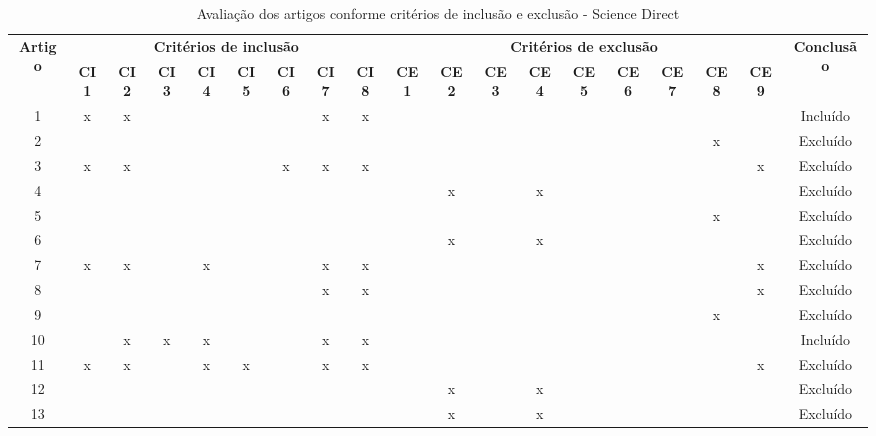 \documentclass[
	12pt,				%
	oneside,			%
	a4paper,			%
	english,			%
	brazil				%
	]{abntex2ppgsi}
\begin{document}
\begin{apendicesenv}
\begin{table}[H]
\centering
\caption{Avaliação dos artigos conforme critérios de inclusão e exclusão - Science Direct}
\label{tab:crit_IncExc_SD}
\setlength{\tabcolsep}{1.5pt} %
\footnotesize %
\begin{tabular}{c | c c c c c c c c | c c c c c c c c c | c}
\toprule
    \multirow{2}{*}{\textbf{Artigo}} & 
    \multicolumn{8}{c|}{\textbf{Critérios de inclusão}} &
    \multicolumn{9}{c|}{\textbf{Critérios de exclusão}} &
    \multirow{2}{*}{\textbf{Conclusão}} \\ 
    \cline{2-18}
 & \tiny\textbf{CI1} & \tiny\textbf{CI2} & \tiny\textbf{CI3} & \tiny\textbf{CI4} & \tiny\textbf{CI5} & \tiny\textbf{CI6} & \tiny\textbf{CI7} & \tiny\textbf{CI8} & \tiny\textbf{CE1} & \tiny\textbf{CE2} & \tiny\textbf{CE3} & \tiny\textbf{CE4} & \tiny\textbf{CE5} & \tiny\textbf{CE6} & \tiny\textbf{CE7} & \tiny\textbf{CE8} & \tiny\textbf{CE9} & \\
\midrule
 1 & x & x &   &   &   &   & x & x &   &   &   &   &   &   &   &   &   & Incluído \\
 2 &   &   &   &   &   &   &   &   &   &   &   &   &   &   &   & x &   & Excluído \\
 3 & x & x &   &   &   & x & x & x &   &   &   &   &   &   &   &   & x & Excluído \\
 4 &   &   &   &   &   &   &   &   &   & x &   & x &   &   &   &   &   & Excluído \\
 5 &   &   &   &   &   &   &   &   &   &   &   &   &   &   &   & x &   & Excluído \\
 6 &   &   &   &   &   &   &   &   &   & x &   & x &   &   &   &   &   & Excluído \\
 7 & x & x &   & x &   &   & x & x &   &   &   &   &   &   &   &   & x & Excluído \\
 8 &   &   &   &   &   &   & x & x &   &   &   &   &   &   &   &   & x & Excluído \\
 9 &   &   &   &   &   &   &   &   &   &   &   &   &   &   &   & x &   & Excluído \\
10 &   & x & x & x &   &   & x & x &   &   &   &   &   &   &   &   &   & Incluído \\
11 & x & x &   & x & x &   & x & x &   &   &   &   &   &   &   &   & x & Excluído \\
12 &   &   &   &   &   &   &   &   &   & x &   & x &   &   &   &   &   & Excluído \\
13 &   &   &   &   &   &   &   &   &   & x &   & x &   &   &   &   &   & Excluído \\

\end{tabular}
\end{table}
\end{apendicesenv}
\end{document}
